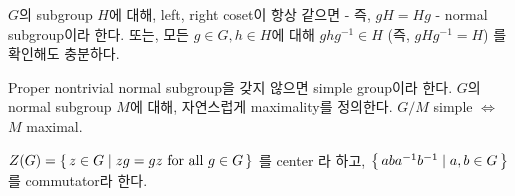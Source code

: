 \begin{definition}
    $G$의 subgroup $H$에 대해, left, right coset이 항상 같으면 - 즉, $gH = Hg$ - normal subgroup이라 한다. 또는, 모든 $g \in G, h \in H$에 대해 $ghg^{-1} \in H$ (즉, $gHg^{-1} = H$) 를 확인해도 충분하다.
\end{definition}

Proper nontrivial normal subgroup을 갖지 않으면 simple group이라 한다. $G$의 normal subgroup $M$에 대해, 자연스럽게 maximality를 정의한다. $G/M$ simple $\iff$ $M$ maximal.

\begin{definition}
    $Z(G) = \left\{\, z \in G \mid zg = gz \text{ for all } g \in G \, \right\}$ 를 center 라 하고, $\left\{\, aba^{-1}b^{-1} \mid a, b \in G \, \right\}$ 를 commutator라 한다.

\end{definition}
